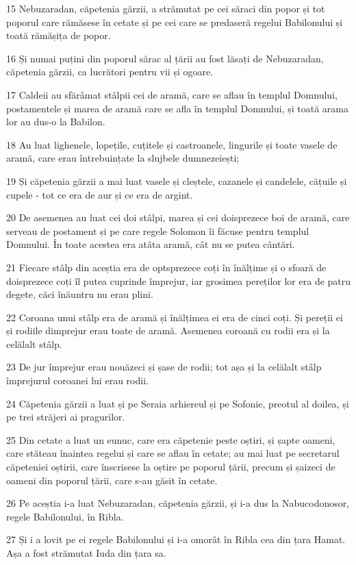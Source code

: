 \par 15 Nebuzaradan, căpetenia gărzii, a strămutat pe cei săraci din popor și tot poporul care rămăsese în cetate și pe cei care se predaseră regelui Babilonului și toată rămășița de popor.
\par 16 Și numai puțini din poporul sărac al țării au fost lăsați de Nebuzaradan, căpetenia gărzii, ca lucrători pentru vii și ogoare.
\par 17 Caldeii au sfărâmat stâlpii cei de aramă, care se aflau în templul Domnului, postamentele și marea de aramă care se afla în templul Domnului, și toată arama lor au dus-o la Babilon.
\par 18 Au luat lighenele, lopețile, cuțitele și castroanele, lingurile și toate vasele de aramă, care erau întrebuințate la slujbele dumnezeiești;
\par 19 Și căpetenia gărzii a mai luat vasele și cleștele, cazanele și candelele, cățuile și cupele - tot ce era de aur și ce era de argint.
\par 20 De asemenea au luat cei doi stâlpi, marea și cei doisprezece boi de aramă, care serveau de postament și pe care regele Solomon îi făcuse pentru templul Domnului. În toate acestea era atâta aramă, cât nu se putea cântări.
\par 21 Fiecare stâlp din aceștia era de optsprezece coți în înălțime și o sfoară de doisprezece coți îl putea cuprinde împrejur, iar grosimea pereților lor era de patru degete, căci înăuntru nu erau plini.
\par 22 Coroana unui stâlp era de aramă și înălțimea ei era de cinci coți. Și pereții ei și rodiile dimprejur erau toate de aramă. Asemenea coroană cu rodii era și la celălalt stâlp.
\par 23 De jur împrejur erau nouăzeci și șase de rodii; tot așa și la celălalt stâlp împrejurul coroanei lui erau rodii.
\par 24 Căpetenia gărzii a luat și pe Seraia arhiereul și pe Sofonie, preotul al doilea, și pe trei străjeri ai pragurilor.
\par 25 Din cetate a luat un eunuc, care era căpetenie peste oștiri, și șapte oameni, care stăteau înaintea regelui și care se aflau în cetate; au mai luat pe secretarul căpeteniei oștirii, care înscrisese la oștire pe poporul țării, precum și șaizeci de oameni din poporul țării, care s-au găsit în cetate.
\par 26 Pe aceștia i-a luat Nebuzaradan, căpetenia gărzii, și i-a dus la Nabucodonosor, regele Babilonului, în Ribla.
\par 27 Și i a lovit pe ei regele Babilonului și i-a omorât în Ribla cea din țara Hamat. Așa a fost strămutat Iuda din țara sa.
